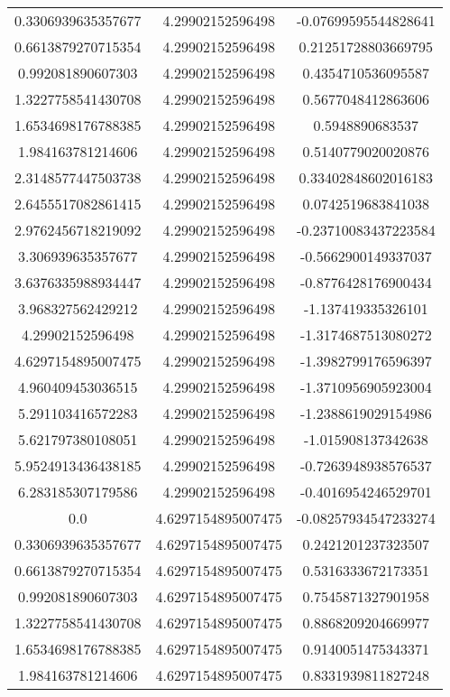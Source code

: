 \begin{table}
\begin{tabular}{ccc}
0.3306939635357677 & 4.29902152596498 & -0.07699595544828641 \\
0.6613879270715354 & 4.29902152596498 & 0.21251728803669795 \\
0.992081890607303 & 4.29902152596498 & 0.4354710536095587 \\
1.3227758541430708 & 4.29902152596498 & 0.5677048412863606 \\
1.6534698176788385 & 4.29902152596498 & 0.5948890683537 \\
1.984163781214606 & 4.29902152596498 & 0.5140779020020876 \\
2.3148577447503738 & 4.29902152596498 & 0.33402848602016183 \\
2.6455517082861415 & 4.29902152596498 & 0.0742519683841038 \\
2.9762456718219092 & 4.29902152596498 & -0.23710083437223584 \\
3.306939635357677 & 4.29902152596498 & -0.5662900149337037 \\
3.6376335988934447 & 4.29902152596498 & -0.8776428176900434 \\
3.968327562429212 & 4.29902152596498 & -1.137419335326101 \\
4.29902152596498 & 4.29902152596498 & -1.3174687513080272 \\
4.6297154895007475 & 4.29902152596498 & -1.3982799176596397 \\
4.960409453036515 & 4.29902152596498 & -1.3710956905923004 \\
5.291103416572283 & 4.29902152596498 & -1.2388619029154986 \\
5.621797380108051 & 4.29902152596498 & -1.015908137342638 \\
5.9524913436438185 & 4.29902152596498 & -0.7263948938576537 \\
6.283185307179586 & 4.29902152596498 & -0.4016954246529701 \\
0.0 & 4.6297154895007475 & -0.08257934547233274 \\
0.3306939635357677 & 4.6297154895007475 & 0.2421201237323507 \\
0.6613879270715354 & 4.6297154895007475 & 0.5316333672173351 \\
0.992081890607303 & 4.6297154895007475 & 0.7545871327901958 \\
1.3227758541430708 & 4.6297154895007475 & 0.8868209204669977 \\
1.6534698176788385 & 4.6297154895007475 & 0.9140051475343371 \\
1.984163781214606 & 4.6297154895007475 & 0.8331939811827248 \\

\end{tabular}
\end{table}

